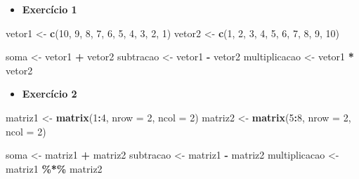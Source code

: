 \documentclass[
]{book}
\newenvironment{Shaded}{\begin{snugshade}}{\end{snugshade}}
\newcommand{\AttributeTok}[1]{\textcolor[rgb]{0.13,0.29,0.53}{#1}}
\newcommand{\DecValTok}[1]{\textcolor[rgb]{0.00,0.00,0.81}{#1}}
\newcommand{\FunctionTok}[1]{\textcolor[rgb]{0.13,0.29,0.53}{\textbf{#1}}}
\newcommand{\NormalTok}[1]{#1}
\newcommand{\OtherTok}[1]{\textcolor[rgb]{0.56,0.35,0.01}{#1}}
\newcommand{\SpecialCharTok}[1]{\textcolor[rgb]{0.81,0.36,0.00}{\textbf{#1}}}
\providecommand{\tightlist}{%
  \setlength{\itemsep}{0pt}\setlength{\parskip}{0pt}}
\begin{document}
\begin{itemize}
\tightlist
\item
  \textbf{Exercício 1}
\end{itemize}

\begin{Shaded}
\begin{Highlighting}[]
\NormalTok{vetor1 }\OtherTok{\textless{}{-}} \FunctionTok{c}\NormalTok{(}\DecValTok{10}\NormalTok{, }\DecValTok{9}\NormalTok{, }\DecValTok{8}\NormalTok{, }\DecValTok{7}\NormalTok{, }\DecValTok{6}\NormalTok{, }\DecValTok{5}\NormalTok{, }\DecValTok{4}\NormalTok{, }\DecValTok{3}\NormalTok{, }\DecValTok{2}\NormalTok{, }\DecValTok{1}\NormalTok{)}
\NormalTok{vetor2 }\OtherTok{\textless{}{-}} \FunctionTok{c}\NormalTok{(}\DecValTok{1}\NormalTok{, }\DecValTok{2}\NormalTok{, }\DecValTok{3}\NormalTok{, }\DecValTok{4}\NormalTok{, }\DecValTok{5}\NormalTok{, }\DecValTok{6}\NormalTok{, }\DecValTok{7}\NormalTok{, }\DecValTok{8}\NormalTok{, }\DecValTok{9}\NormalTok{, }\DecValTok{10}\NormalTok{)}

\NormalTok{soma }\OtherTok{\textless{}{-}}\NormalTok{ vetor1 }\SpecialCharTok{+}\NormalTok{ vetor2}
\NormalTok{subtracao }\OtherTok{\textless{}{-}}\NormalTok{ vetor1 }\SpecialCharTok{{-}}\NormalTok{ vetor2}
\NormalTok{multiplicacao }\OtherTok{\textless{}{-}}\NormalTok{ vetor1 }\SpecialCharTok{*}\NormalTok{ vetor2}
\end{Highlighting}
\end{Shaded}

\begin{itemize}
\tightlist
\item
  \textbf{Exercício 2}
\end{itemize}

\begin{Shaded}
\begin{Highlighting}[]
\NormalTok{matriz1 }\OtherTok{\textless{}{-}} \FunctionTok{matrix}\NormalTok{(}\DecValTok{1}\SpecialCharTok{:}\DecValTok{4}\NormalTok{, }\AttributeTok{nrow =} \DecValTok{2}\NormalTok{, }\AttributeTok{ncol =} \DecValTok{2}\NormalTok{)}
\NormalTok{matriz2 }\OtherTok{\textless{}{-}} \FunctionTok{matrix}\NormalTok{(}\DecValTok{5}\SpecialCharTok{:}\DecValTok{8}\NormalTok{, }\AttributeTok{nrow =} \DecValTok{2}\NormalTok{, }\AttributeTok{ncol =} \DecValTok{2}\NormalTok{)}

\NormalTok{soma }\OtherTok{\textless{}{-}}\NormalTok{ matriz1 }\SpecialCharTok{+}\NormalTok{ matriz2}
\NormalTok{subtracao }\OtherTok{\textless{}{-}}\NormalTok{ matriz1 }\SpecialCharTok{{-}}\NormalTok{ matriz2}
\NormalTok{multiplicacao }\OtherTok{\textless{}{-}}\NormalTok{ matriz1 }\SpecialCharTok{\%*\%}\NormalTok{ matriz2}
\end{Highlighting}
\end{Shaded}
\end{document}
